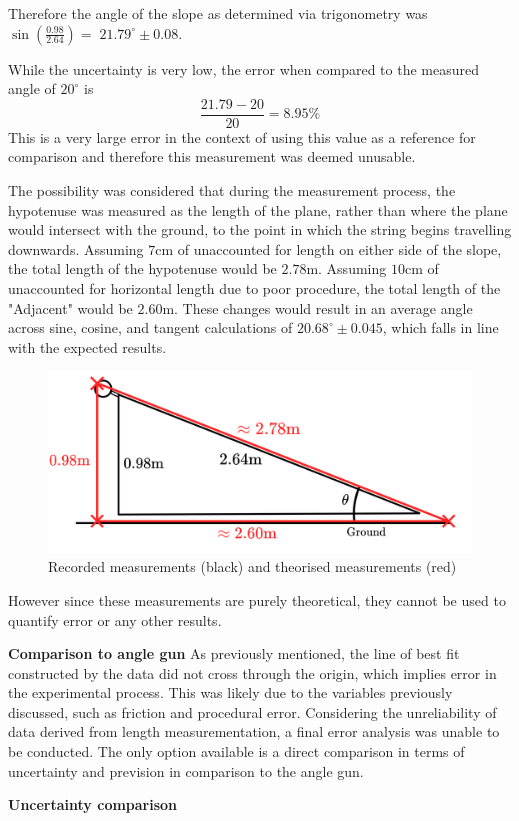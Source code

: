 \documentclass[11pt,a4paper]{article}
\begin{document}
 
 
 
 Therefore the angle of the slope as determined via trigonometry was $\sin\left({\frac{0.98}{2.64}}\right)=\;21.79^\circ \pm0.08$.
 


While the uncertainty is very low, the error when compared to the measured angle of $20^\circ$ is $$\frac{21.79-20}{20}=8.95\%$$
This is a very large error in the context of using this value as a reference for comparison and therefore this measurement was deemed unusable.


The possibility was considered that during the measurement process, the hypotenuse was measured as the length of the plane, rather than where the plane would intersect with the ground, to the point in which the string begins travelling downwards. Assuming $7$cm of unaccounted for length on either side of the slope, the total length of the hypotenuse would be $2.78$m. Assuming $10$cm of unaccounted for horizontal length due to poor procedure, the total length of the "Adjacent" would be $2.60$m. These changes would result in an average angle across sine, cosine, and tangent calculations of $20.68^\circ \pm0.045$, which falls in line with the expected results.

\begin{figure}[H]
	\centering
	\includegraphics[width=0.5\paperwidth]{./Diagrams/LengthDiagramRevised.png}
	\caption{Recorded measurements (black) and theorised measurements (red)}
\end{figure}
However since these measurements are purely theoretical, they cannot be used to quantify error or any other results.




	{\large
	\textbf{Comparison to angle gun}}
As previously mentioned, the line of best fit constructed by the data did not cross through the origin, which implies error in the experimental process. This was likely due to the variables previously discussed, such as friction and procedural error. 
Considering the unreliability of data derived from length measurementation, a final error analysis was unable to be conducted. The only option available is a direct comparison in terms of uncertainty and prevision in comparison to the angle gun. 
\begin{center}
	\textbf{Uncertainty comparison}
\end{center}
\end{document}
